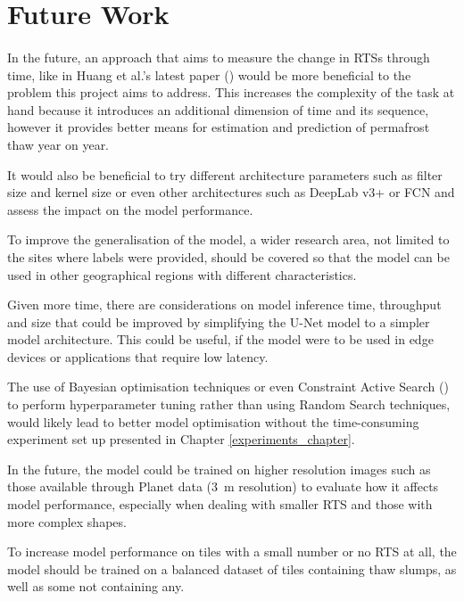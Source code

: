 \section{Future Work}
\paragraph{}
In the future, an approach that aims to measure the change in \gls{RTS}s through time, like in Huang et al.'s latest paper (\cite{HUANG2021102399}) would be more beneficial to the problem this project aims to address. This increases the complexity of the task at hand because it introduces an additional dimension of time and its sequence, however it provides better means for estimation and prediction of permafrost thaw year on year.

It would also be beneficial to try different architecture parameters such as filter size and kernel size or even other architectures such as DeepLab v3+ or \gls{FCN} and assess the impact on the model performance.

To improve the generalisation of the model, a wider research area, not limited to the sites where labels were provided, should be covered so that the model can be used in other geographical regions with different characteristics.

Given more time, there are considerations on model inference time, throughput and size that could be improved by simplifying the U-Net model to a simpler model architecture. This could be useful, if the model were to be used in edge devices or applications that require low latency.

The use of Bayesian optimisation techniques or even Constraint Active Search (\cite{pmlr-v139-malkomes21a}) to perform hyperparameter tuning rather than using Random Search techniques, would likely lead to better model optimisation without the time-consuming experiment set up presented in Chapter \ref{experiments_chapter}.

In the future, the model could be trained on higher resolution images such as those available through Planet data (\SI{3}{\metre} resolution) to evaluate how it affects model performance, especially when dealing with smaller \gls{RTS} and those with more complex shapes.

To increase model performance on tiles with a small number or no \gls{RTS} at all, the model should be trained on a balanced dataset of tiles containing thaw slumps, as well as some not containing any.